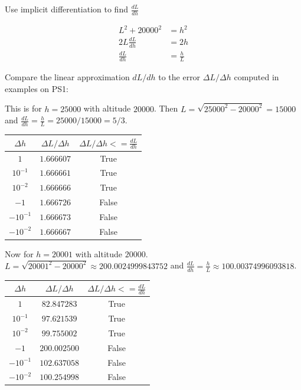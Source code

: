 \documentclass[9pt]{article}
\begin{document}
\begin{tcolorbox}
Use implicit differentiation to find $\frac{dL}{dh}$
\end{tcolorbox}
\begin{align*}
  L^2 + 20000^2 &= h^2 \\
  2L\frac{dL}{dh} &= 2h \\
  \frac{dL}{dh} &= \frac{h}{L}
\end{align*}

\begin{tcolorbox}
  Compare the linear approximation $dL/dh$ to the error $\Delta L / \Delta h$ computed in examples on PS1:
\end{tcolorbox}

This is for $h = 25000$ with altitude $20000$. Then $L = \sqrt{25000^2 - 20000^2} = 15000$ and $\frac{dL}{dh} = \frac{h}{L} = 25000 / 15000 = 5 / 3$.
\begin{center}
  \begin{tabular}{|c|c|c|}
    \hline
    \rowcolor{Gray}
    $\Delta h$ & $\Delta L / \Delta h$ & $\Delta L / \Delta h <= \frac{dL}{dh}$ \\ \hline
    $1$ & $1.666607$ & True \\ \hline
    $10^{-1}$ & $1.666661$ & True \\ \hline
    $10^{-2}$ & $1.666666$ & True \\ \hline
    $-1$ & $1.666726$ & False \\ \hline
    $-10^{-1}$ & $1.666673$ & False \\ \hline
    $-10^{-2}$ & $1.666667$ & False \\ \hline
  \end{tabular}
\end{center}

Now for $h = 20001$ with altitude $20000$. $L = \sqrt{20001^2 - 20000^2} \approx 200.0024999843752$ and $\frac{dL}{dh} = \frac{h}{L} \approx 100.00374996093818$.
\begin{center}
  \begin{tabular}{|c|c|c|}
    \hline
    \rowcolor{Gray}
    $\Delta h$ & $\Delta L / \Delta h$ & $\Delta L / \Delta h <= \frac{dL}{dh}$ \\ \hline
    $1$ & $82.847283$ & True \\ \hline
    $10^{-1}$ & $97.621539$ & True \\ \hline
    $10^{-2}$ & $99.755002$ & True \\ \hline
    $-1$ & $200.002500$ & False \\ \hline
    $-10^{-1}$ & $102.637058$ & False \\ \hline
    $-10^{-2}$ & $100.254998$ & False \\ \hline
  \end{tabular}
\end{center}
\end{document}
